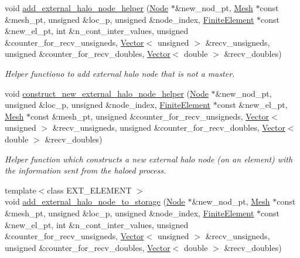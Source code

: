 \begin{DoxyCompactItemize}
void \hyperlink{namespaceoomph_1_1Missing__masters__functions_a537b9f129421d1ad4f6915794d9dd66f}{add\+\_\+external\+\_\+halo\+\_\+node\+\_\+helper} (\hyperlink{classoomph_1_1Node}{Node} $\ast$\&new\+\_\+nod\+\_\+pt, \hyperlink{classoomph_1_1Mesh}{Mesh} $\ast$const \&mesh\+\_\+pt, unsigned \&loc\+\_\+p, unsigned \&node\+\_\+index, \hyperlink{classoomph_1_1FiniteElement}{Finite\+Element} $\ast$const \&new\+\_\+el\+\_\+pt, int \&n\+\_\+cont\+\_\+inter\+\_\+values, unsigned \&counter\+\_\+for\+\_\+recv\+\_\+unsigneds, \hyperlink{classoomph_1_1Vector}{Vector}$<$ unsigned $>$ \&recv\+\_\+unsigneds, unsigned \&counter\+\_\+for\+\_\+recv\+\_\+doubles, \hyperlink{classoomph_1_1Vector}{Vector}$<$ double $>$ \&recv\+\_\+doubles)
\begin{DoxyCompactList}\small\item\em Helper functiono to add external halo node that is not a master. \end{DoxyCompactList}\item 
void \hyperlink{namespaceoomph_1_1Missing__masters__functions_ae60b3fe43b4c8a9ccd03d2bc22f437c6}{construct\+\_\+new\+\_\+external\+\_\+halo\+\_\+node\+\_\+helper} (\hyperlink{classoomph_1_1Node}{Node} $\ast$\&new\+\_\+nod\+\_\+pt, unsigned \&loc\+\_\+p, unsigned \&node\+\_\+index, \hyperlink{classoomph_1_1FiniteElement}{Finite\+Element} $\ast$const \&new\+\_\+el\+\_\+pt, \hyperlink{classoomph_1_1Mesh}{Mesh} $\ast$const \&mesh\+\_\+pt, unsigned \&counter\+\_\+for\+\_\+recv\+\_\+unsigneds, \hyperlink{classoomph_1_1Vector}{Vector}$<$ unsigned $>$ \&recv\+\_\+unsigneds, unsigned \&counter\+\_\+for\+\_\+recv\+\_\+doubles, \hyperlink{classoomph_1_1Vector}{Vector}$<$ double $>$ \&recv\+\_\+doubles)
\begin{DoxyCompactList}\small\item\em Helper function which constructs a new external halo node (on an element) with the information sent from the haloed process. \end{DoxyCompactList}\item 
{\footnotesize template$<$class E\+X\+T\+\_\+\+E\+L\+E\+M\+E\+NT $>$ }\\void \hyperlink{namespaceoomph_1_1Missing__masters__functions_a9510959d4583c82a516d520c9da35a93}{add\+\_\+external\+\_\+halo\+\_\+node\+\_\+to\+\_\+storage} (\hyperlink{classoomph_1_1Node}{Node} $\ast$\&new\+\_\+nod\+\_\+pt, \hyperlink{classoomph_1_1Mesh}{Mesh} $\ast$const \&mesh\+\_\+pt, unsigned \&loc\+\_\+p, unsigned \&node\+\_\+index, \hyperlink{classoomph_1_1FiniteElement}{Finite\+Element} $\ast$const \&new\+\_\+el\+\_\+pt, int \&n\+\_\+cont\+\_\+inter\+\_\+values, unsigned \&counter\+\_\+for\+\_\+recv\+\_\+unsigneds, \hyperlink{classoomph_1_1Vector}{Vector}$<$ unsigned $>$ \&recv\+\_\+unsigneds, unsigned \&counter\+\_\+for\+\_\+recv\+\_\+doubles, \hyperlink{classoomph_1_1Vector}{Vector}$<$ double $>$ \&recv\+\_\+doubles)

\end{DoxyCompactItemize}
